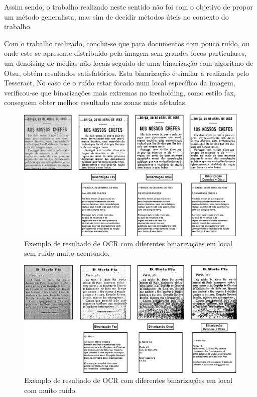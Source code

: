 Assim sendo, o trabalho realizado neste sentido não foi com o objetivo de propor um método generalista, mas sim de decidir métodos úteis no contexto do trabalho.

Com o trabalho realizado, conclui-se que para documentos com pouco ruído, ou onde este se apresente distribuído pela imagem sem grandes focos particulares, um denoising de médias não locais seguido de uma binarização com algoritmo de Otsu, obtém resultados satisfatórios. Esta binarização é similar à realizada pelo Tesseract.
No caso de o ruído estar focado num local específico da imagem, verificou-se que binarizações mais extremas no tresholding, como estilo fax, conseguem obter melhor resultado nas zonas mais afetadas.


\begin{figure}[H]
	\centering
	\includegraphics[width=\textwidth]{images/ilustracoes/ocr_different_binarizations.png}
	\caption{Exemplo de resultado de OCR com diferentes binarizações em local sem ruído muito acentuado.}
	\label{fig:ocr_different_binarizations}
\end{figure}


\begin{figure}[H]
	\centering
	\includegraphics[width=\textwidth]{images/ilustracoes/ocr_different_binarizations_noisy.png}
	\caption{Exemplo de resultado de OCR com diferentes binarizações em local com muito ruído.}
	\label{fig:ocr_different_binarizations_noisy}
\end{figure}


